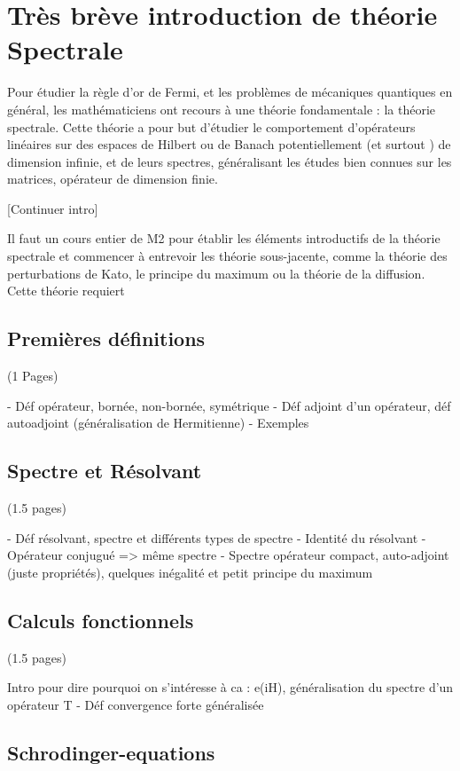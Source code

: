 \documentclass[12pt,openany,a4paper, titlepage]{article}
\theoremstyle{definition}
\theoremstyle{definition}
\theoremstyle{definition}
\theoremstyle{definition}
\theoremstyle{definition}
\theoremstyle{definition}
\begin{document}
\section{Très brève introduction de théorie Spectrale}

Pour étudier la règle d'or de Fermi, et les problèmes de mécaniques quantiques en général, les mathématiciens ont recours à une théorie fondamentale : la théorie spectrale. Cette théorie a pour but d'étudier le comportement d'opérateurs linéaires sur des espaces de Hilbert ou de Banach potentiellement (et surtout ) de dimension infinie, et de leurs spectres, généralisant les études bien connues sur les matrices, opérateur de dimension finie. 

[Continuer intro]

Il faut un cours entier de M2 pour établir les éléments introductifs de la théorie spectrale et commencer à entrevoir les théorie sous-jacente, comme la théorie des perturbations de Kato, le principe du maximum ou la théorie de la diffusion. Cette théorie requiert 

\subsection{Premières définitions} (1 Pages)

- Déf opérateur, bornée, non-bornée, symétrique
- Déf adjoint d'un opérateur, déf autoadjoint (généralisation de Hermitienne)
- Exemples

\subsection{Spectre et Résolvant} (1.5 pages)

- Déf résolvant, spectre et différents types de spectre
- Identité du résolvant
- Opérateur conjugué => même spectre
- Spectre opérateur compact, auto-adjoint (juste propriétés), quelques inégalité et petit principe du maximum


\subsection{Calculs fonctionnels} (1.5 pages)

Intro pour dire pourquoi on s'intéresse à ca : e(iH), généralisation du spectre d'un opérateur T
- Déf convergence forte généralisée

\subsection{Schrodinger-equations}
\end{document}
